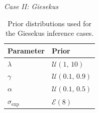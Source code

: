 \documentclass{elsarticle}
\begin{document}
\FloatBarrier

\emph{Case II: Giesekus}

\begin{table}[!ht]
\centering
\begin{tabular}{ll}
\toprule
Parameter & Prior \\
\midrule
${\lambda}$ & $\mathcal{U}(1,\,10)$ \\
$\gamma$ & $\mathcal{U}(0.1,\,0.9)$ \\
$\alpha$ & $\mathcal{U}(0.1,\,0.5)$ \\
$\sigma_{\mathrm{exp}}$
& $\mathcal{E}(8)$ \\
\bottomrule
\end{tabular}
\caption{Prior distributions used for the Giesekus inference cases.}
\label{tab:prior_giesekus}
\end{table}
\end{document}
